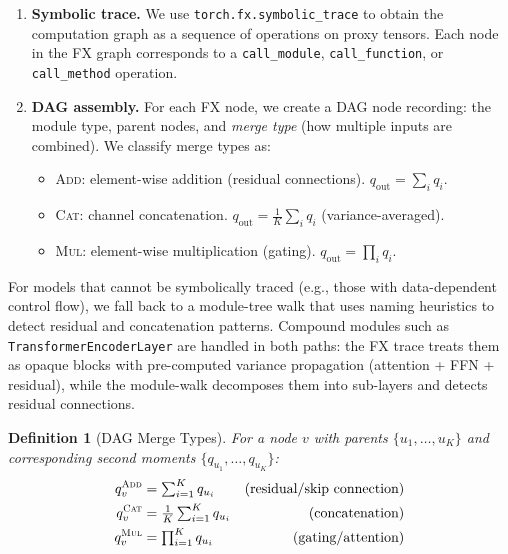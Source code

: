 \documentclass[10pt]{article}
\newtheorem{definition}[theorem]{Definition}
\begin{document}
\begin{enumerate}[nosep]
    \item \textbf{Symbolic trace.} We use \texttt{torch.fx.symbolic\_trace} to obtain the computation graph as a sequence of operations on proxy tensors.  Each node in the FX graph corresponds to a \texttt{call\_module}, \texttt{call\_function}, or \texttt{call\_method} operation.
    \item \textbf{DAG assembly.} For each FX node, we create a DAG node recording: the module type, parent nodes, and \emph{merge type} (how multiple inputs are combined).  We classify merge types as:
    \begin{itemize}[nosep]
        \item \textsc{Add}: element-wise addition (residual connections).  $q_{\mathrm{out}} = \sum_i q_i$.
        \item \textsc{Cat}: channel concatenation.  $q_{\mathrm{out}} = \frac{1}{K}\sum_i q_i$ (variance-averaged).
        \item \textsc{Mul}: element-wise multiplication (gating).  $q_{\mathrm{out}} = \prod_i q_i$.
    \end{itemize}
\end{enumerate}

For models that cannot be symbolically traced (e.g., those with data-dependent control flow), we fall back to a module-tree walk that uses naming heuristics to detect residual and concatenation patterns.
Compound modules such as \texttt{TransformerEncoderLayer} are handled in both paths: the FX trace treats them as opaque blocks with pre-computed variance propagation (attention + FFN + residual), while the module-walk decomposes them into sub-layers and detects residual connections.

\begin{definition}[DAG Merge Types]
\label{def:merge-types}
For a node $v$ with parents $\{u_1, \ldots, u_K\}$ and corresponding second moments $\{q_{u_1}, \ldots, q_{u_K}\}$:
\begin{align}
q_v^{\textsc{Add}} &= \textstyle\sum_{i=1}^K q_{u_i} & \text{(residual/skip connection)} \label{eq:merge-add} \\
q_v^{\textsc{Cat}} &= \textstyle\frac{1}{K}\sum_{i=1}^K q_{u_i} & \text{(concatenation)} \label{eq:merge-cat} \\
q_v^{\textsc{Mul}} &= \textstyle\prod_{i=1}^K q_{u_i} & \text{(gating/attention)} \label{eq:merge-mul}
\end{align}
\end{definition}
\end{document}
